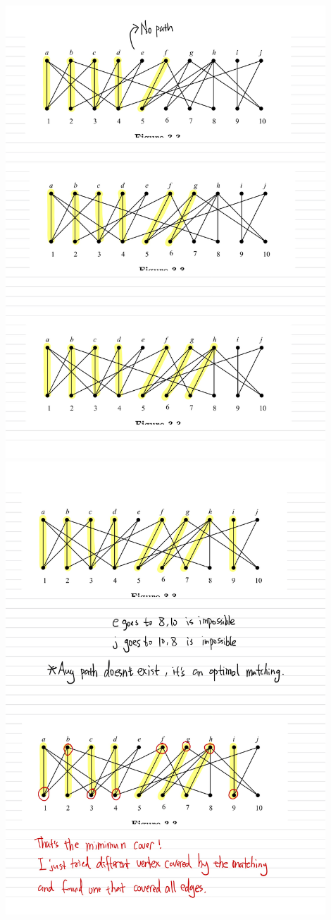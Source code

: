 \documentclass[]{article}
\theoremstyle{definition}
\begin{document}
\begin{center}
        \includegraphics[width=12cm]{HW4-6.jpg}
        \includegraphics[width=12cm]{HW4-7.jpg}
    \end{center}
    
\end{document}
